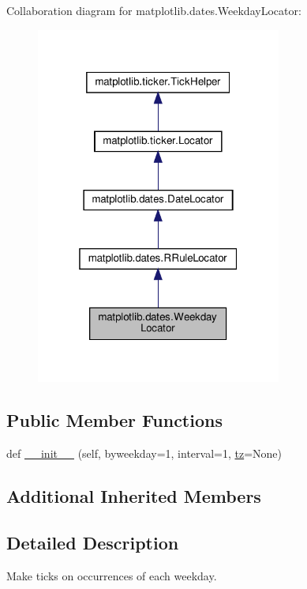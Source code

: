 Collaboration diagram for matplotlib.\+dates.\+Weekday\+Locator\+:
\nopagebreak
\begin{figure}[H]
\begin{center}
\leavevmode
\includegraphics[width=229pt]{classmatplotlib_1_1dates_1_1WeekdayLocator__coll__graph}
\end{center}
\end{figure}
\subsection*{Public Member Functions}
\begin{DoxyCompactItemize}
\item 
def \hyperlink{classmatplotlib_1_1dates_1_1WeekdayLocator_a10a6a731e2ec92647cc7de3c1bf68fc3}{\+\_\+\+\_\+init\+\_\+\+\_\+} (self, byweekday=1, interval=1, \hyperlink{classmatplotlib_1_1dates_1_1DateLocator_aa18faf34dbf00ed4820535b64cd7194e}{tz}=None)
\end{DoxyCompactItemize}
\subsection*{Additional Inherited Members}


\subsection{Detailed Description}
\begin{DoxyVerb}Make ticks on occurrences of each weekday.
\end{DoxyVerb}
 

